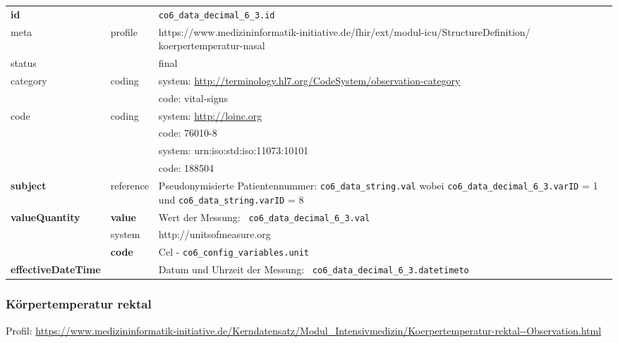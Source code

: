 \begin{longtable}{|l|l|p{7.5cm}|}
	\hline
	\rowcolor{lightgray} \multicolumn{3}{|l|}{Data Mapping (inhaltlich)} \\ \hline
	\textbf{id} &  & \texttt{co6\_data\_decimal\_6\_3.id} \\ \hline
	meta & profile & https://www.medizininformatik-initiative.de/fhir/ext/modul-icu/StructureDefinition/ koerpertemperatur-nasal \\ \hline 
	status &  & final   \\ \hline 
	category & coding & system: \url{http://terminology.hl7.org/CodeSystem/observation-category} \\
	\cline{3-3}
	& & code: vital-signs \\ \hline
		code & coding & system: \url{http://loinc.org} \\ 
	\cline{3-3} 
	&  & code: 76010-8 \\ 
	\cline{3-3} 
	&  & system: urn:iso:std:iso:11073:10101\\ 
	\cline{3-3}
	&  & code: 188504 \\ \hline
	\textbf{subject} & reference & Pseudonymisierte Patientennummer: \texttt{co6\_data\_string.val} wobei \texttt{co6\_data\_decimal\_6\_3.varID} = 1 und \texttt{co6\_data\_string.varID} = 8 \\ \hline
	\textbf{valueQuantity}  & \textbf{value} & Wert der Messung: \texttt{
		co6\_data\_decimal\_6\_3.val} \\
	\cline{2-3}
	& system & http://unitsofmeasure.org \\
	\cline{2-3}
	& \textbf{code} & Cel - \texttt{co6\_config\_variables.unit} \\ \hline
	\textbf{effectiveDateTime}  & & Datum und Uhrzeit der Messung: \texttt{
		co6\_data\_decimal\_6\_3.datetimeto} \\ \hline
\end{longtable}

\subsubsection{Körpertemperatur rektal} 
Profil: \url{https://www.medizininformatik-initiative.de/Kerndatensatz/Modul_Intensivmedizin/Koerpertemperatur-rektal--Observation.html}

